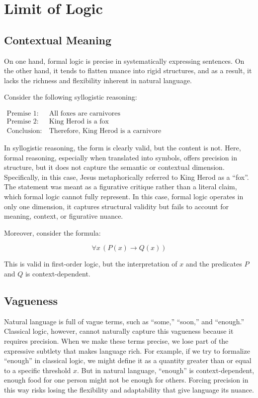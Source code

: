 \documentclass[12pt,a4paper,openany]{article}
\begin{document}
\section{Limit of Logic}

\subsection{Contextual Meaning}\label{contextual-meaning}

On one hand, formal logic is precise in systematically expressing
sentences. On the other hand, it tends to flatten nuance into rigid
structures, and as a result, it lacks the richness and flexibility
inherent in natural language.

Consider the following syllogistic reasoning:

$
\begin{aligned}
\text{Premise 1:} \ & \text{All foxes are carnivores} \\
\text{Premise 2:} \ & \text{King Herod is a fox} \\
\text{Conclusion:} \ & \text{Therefore, King Herod is a carnivore}
\end{aligned}
$

In syllogistic reasoning, the form is clearly valid, but the content is
not. Here, formal reasoning, especially when translated into symbols,
offers precision in structure, but it does not capture the semantic or
contextual dimension. Specifically, in this case, Jesus metaphorically
referred to King Herod as a ``fox''. The statement was meant as a
figurative critique rather than a literal claim, which formal logic
cannot fully represent. In this case, formal logic operates in only one
dimension, it captures structural validity but fails to account for
meaning, context, or figurative nuance.

Moreover, consider the formula:

\[
\forall x \, (P(x) \rightarrow Q(x))
\]

This is valid in first-order logic, but the interpretation of \(x\) and
the predicates \(P\) and \(Q\) is context-dependent.

\subsection{Vagueness}\label{vagueness}

Natural language is full of vague terms, such as ``some,'' ``soon,'' and
``enough.'' Classical logic, however, cannot naturally capture this
vagueness because it requires precision. When we make these terms
precise, we lose part of the expressive subtlety that makes language
rich. For example, if we try to formalize ``enough'' in classical logic,
we might define it as a quantity greater than or equal to a specific
threshold \(x\). But in natural language, ``enough'' is
context-dependent, enough food for one person might not be enough for
others. Forcing precision in this way risks losing the flexibility and
adaptability that give language its nuance.
\end{document}
